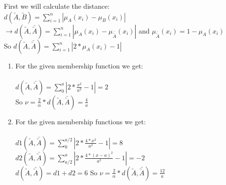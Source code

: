 \documentclass{article}
\begin{document}
\noindent First we will calculate the distance: \\ 
$d(\utilde A,\utilde B) = \sum_{i=1}^{n} | \mu_A(x_i) -  \mu_B(x_i)|$
  $\rightarrow d(\utilde A,\bar{ \utilde{ A}} ) = \sum_{i=1}^{n} | \mu_A(x_i) -  \mu_{\bar{ \utilde{ A}}}(x_i)|$ 
  and $\mu_{\bar{ \utilde{ A}}}(x_i) = 1 - \mu_A(x_i)$ \\
  So $ d(\utilde A,\bar{ \utilde{ A}} ) = \sum_{i=1}^{n} | 2* \mu_A(x_i) -  1| $ \\
\begin{enumerate} [label = \Alph*]
\item
  For the given membership function we get:\\ \\
  $ d(\utilde A,\bar{ \utilde{ A}} ) = \sum_{0}^{a} | 2* \frac{x^2}{a^2} -  1| = 2 $ \\
  So $\nu = \frac{2}{\alpha}* d(\utilde A,\bar{ \utilde{ A}} ) = \frac{4}{a}$

  \item For the given membership functions we get:\\ \\
  $ d1(\utilde A,\bar{ \utilde{ A}} ) = \sum_{0}^{a/2} | 2* \frac{4*x^2}{a^2} -  1| = 8 $ \\
  $ d2(\utilde A,\bar{ \utilde{ A}} ) = \sum_{a/2}^{a} | 2* \frac{4*(x-a)^2}{a^2} -  1| = -2 $ \\
  $ d(\utilde A,\bar{ \utilde{ A}} ) = d1 + d2 = 6 $
  So $\nu = \frac{2}{\alpha}* d(\utilde A,\bar{ \utilde{ A}} ) = \frac{12}{a}$

\end{enumerate}
\end{document}
